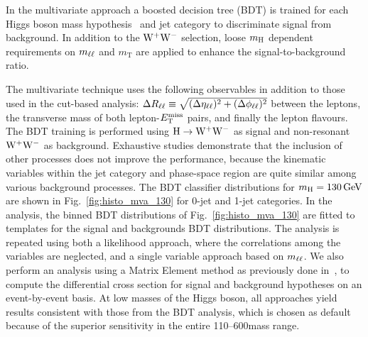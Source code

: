 \documentclass[12pt,twoside,a4paper,cmspaper,final,collab]{cms-tdr}
\begin{document}
In the multivariate approach a boosted decision tree (BDT)
is trained for each Higgs boson mass hypothesis~\cite{tmva} and jet category
to discriminate signal from background. In addition to the $\mathrm{W^+}{}\mathrm{W^-}$ selection,
loose $m_{\mathrm{H}}$ dependent requirements on $m_{\mathrm{\ell}\mathrm{\ell}}$ and
$m_\mathrm{T}$ are applied to enhance the signal-to-background ratio.

The multivariate technique
uses the following observables in addition to those used in the cut-based
analysis: $\Delta R_{\mathrm{\ell}\mathrm{\ell}}\equiv\sqrt{(\Delta\eta_{\mathrm{\ell}\mathrm{\ell}})^2 + (\Delta\phi_{\mathrm{\ell}\mathrm{\ell}})^2}$
between the leptons, the transverse mass of both lepton-$E_{\mathrm{T}}^{\text{miss}}$ pairs, and finally
the lepton flavours.
The BDT training is performed using $\mathrm{H}\to\mathrm{W^+}{}\mathrm{W^-}$ as signal and non-resonant
$\mathrm{W^+}{}\mathrm{W^-}$ as background. Exhaustive studies demonstrate that
the inclusion of other processes does not improve
the performance, because the kinematic variables within the jet category and phase-space
region are quite similar among various background processes.
The BDT classifier distributions for $m_{\mathrm{H}}=130\,\text{Ge\hspace{-.08em}V}$ are shown in
Fig.~\ref{fig:histo_mva_130} for 0-jet and 1-jet categories. In the analysis, the binned
BDT distributions of Fig.~\ref{fig:histo_mva_130} are fitted to templates for the signal and
backgrounds BDT distributions.
The analysis is repeated using both a likelihood approach,
where the correlations among the variables are neglected, and a single
variable approach based on $m_{\mathrm{\ell}\mathrm{\ell}}$.
We also perform an analysis using a Matrix Element
method as previously done in~\cite{Aaltonen:2008ec}, to compute the differential cross section
for signal and background hypotheses on an event-by-event basis.
At low masses of the Higgs boson, all approaches yield results
consistent with those from the BDT analysis,
which is chosen as default because of the superior sensitivity in the entire 110--600\GeV mass range.
\end{document}
